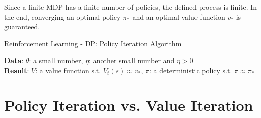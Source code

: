 Since a finite MDP has a finite number of policies, the defined process is finite. In the end, converging an optimal policy $\pi_*$ and an optimal value function $v_*$ is guaranteed.

\begin{algorithm}[h!]
    \caption{Reinforcement Learning - DP: Policy Iteration Algorithm}

    \textbf{Data}: $\theta$: a small number, $\eta$: another small number and $\eta > 0$\\
    \textbf{Result}: $V$: a value function s.t. $V_t(s) \approx v_*$, $\pi$: a deterministic policy s.t. $\pi \approx \pi_*$\\

\end{algorithm}

\section{Policy Iteration vs. Value Iteration \cite{baeldung/cs/ml-value-iteration-vs-policy-iteration}}

